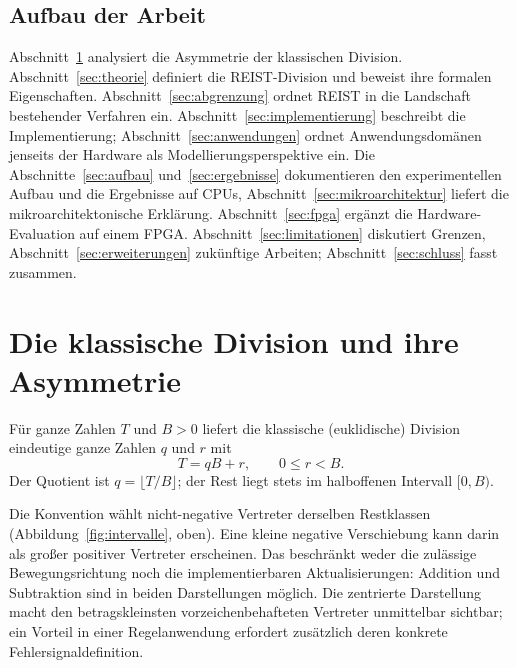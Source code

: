 \documentclass[11pt,a4paper]{scrartcl}
\theoremstyle{definition}
\theoremstyle{plain}
\theoremstyle{remark}
\begin{document}
\subsection{Aufbau der Arbeit}

Abschnitt~\ref{sec:klassisch} analysiert die Asymmetrie der klassischen Division. Abschnitt~\ref{sec:theorie} definiert die REIST-Division und beweist ihre formalen Eigenschaften. Abschnitt~\ref{sec:abgrenzung} ordnet REIST in die Landschaft bestehender Verfahren ein. Abschnitt~\ref{sec:implementierung} beschreibt die Implementierung; Abschnitt~\ref{sec:anwendungen} ordnet Anwendungsdomänen jenseits der Hardware als Modellierungsperspektive ein. Die Abschnitte~\ref{sec:aufbau} und~\ref{sec:ergebnisse} dokumentieren den experimentellen Aufbau und die Ergebnisse auf CPUs, Abschnitt~\ref{sec:mikroarchitektur} liefert die mikroarchitektonische Erklärung. Abschnitt~\ref{sec:fpga} ergänzt die Hardware-Evaluation auf einem FPGA. Abschnitt~\ref{sec:limitationen} diskutiert Grenzen, Abschnitt~\ref{sec:erweiterungen} zukünftige Arbeiten; Abschnitt~\ref{sec:schluss} fasst zusammen.

\section{Die klassische Division und ihre Asymmetrie}
\label{sec:klassisch}

Für ganze Zahlen $T$ und $B > 0$ liefert die klassische (euklidische) Division \cite{knuth} eindeutige ganze Zahlen $q$ und $r$ mit
\begin{equation}
T = qB + r, \qquad 0 \le r < B.
\label{eq:klassisch}
\end{equation}
Der Quotient ist $q = \lfloor T/B \rfloor$; der Rest liegt stets im halboffenen Intervall $[0, B)$.

Die Konvention wählt nicht-negative Vertreter derselben Restklassen (Abbildung~\ref{fig:intervalle}, oben). Eine kleine negative Verschiebung kann darin als großer positiver Vertreter erscheinen. Das beschränkt weder die zulässige Bewegungsrichtung noch die implementierbaren Aktualisierungen: Addition und Subtraktion sind in beiden Darstellungen möglich. Die zentrierte Darstellung macht den betragskleinsten vorzeichenbehafteten Vertreter unmittelbar sichtbar; ein Vorteil in einer Regelanwendung erfordert zusätzlich deren konkrete Fehlersignaldefinition.
\end{document}
